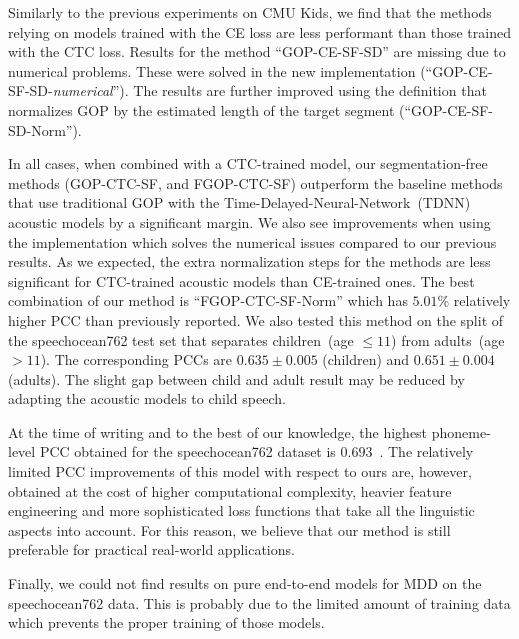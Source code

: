 Similarly to the previous experiments on CMU Kids, we find that the methods relying on models trained with the CE loss are less performant than those trained with the CTC loss. 
Results for the method ``GOP-CE-SF-SD'' are missing due to numerical problems.
These were solved in the new implementation (``GOP-CE-SF-SD-\textit{numerical}'').
The results are further improved using the definition that normalizes GOP by the estimated length of the target segment (``GOP-CE-SF-SD-Norm'').

In all cases, when combined with a CTC-trained model, our segmentation-free methods (GOP-CTC-SF, and FGOP-CTC-SF) outperform the baseline methods that use traditional GOP with the Time-Delayed-Neural-Network~(TDNN) acoustic models by a significant margin.
We also see improvements when using the implementation which solves the numerical issues compared to our previous results. 
As we expected, the extra normalization steps for the methods are less significant for CTC-trained acoustic models than CE-trained ones. 
The best combination of our method is ``FGOP-CTC-SF-Norm'' which has  $5.01\%$ relatively higher PCC than previously reported. 
We also tested this method on the split of the speechocean762 test set that separates children~(age $\leq 11$) from adults~(age $> 11$).
The corresponding PCCs are $0.635\pm 0.005$ (children) and $0.651\pm 0.004$ (adults).
The slight gap between child and adult result may be reduced by adapting the acoustic models to child speech.

At the time of writing and to the best of our knowledge, the highest phoneme-level PCC obtained for the speechocean762  dataset is $0.693$~\cite{chao23_interspeech}.
The relatively limited PCC improvements of this model with respect to ours are, however, obtained at the cost of higher computational complexity, heavier feature engineering and more sophisticated loss functions that take all the linguistic aspects into account.
For this reason, we believe that our method is still preferable for practical real-world applications.

Finally, we could not find results on pure end-to-end models for MDD on the speechocean762 data.
This is probably due to the limited amount of training data which prevents the proper training of those models.
